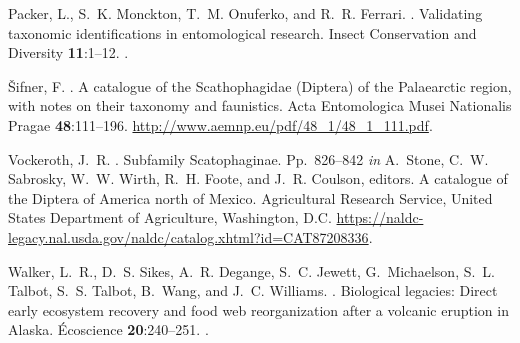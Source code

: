\begin{thebibliography}{8}
Packer, L., S.~K. Monckton, T.~M. Onuferko, and R.~R. Ferrari.
.
\newblock Validating taxonomic identifications in entomological research.
\newblock Insect Conservation and Diversity {\bfseries 11}:1--12.
\newblock {}.

\v{S}ifner, F.
.
\newblock A catalogue of the Scathophagidae (Diptera) of the Palaearctic
  region, with notes on their taxonomy and faunistics.
\newblock Acta Entomologica Musei Nationalis Pragae {\bfseries 48}:111--196.
\newblock \urlprefix\url{http://www.aemnp.eu/pdf/48_1/48_1_111.pdf}.

Vockeroth, J.~R.
.
\newblock Subfamily {Scatophaginae}.
\newblock Pp.\ 826--842 {\em in\/} A.~Stone, C.~W. Sabrosky, W.~W. Wirth, R.~H.
  Foote, and J.~R. Coulson, editors. A catalogue of the {Diptera} of {America}
  north of {Mexico}. Agricultural Research Service, United States Department of
  Agriculture, Washington, D.C.
\newblock
  \urlprefix\url{https://naldc-legacy.nal.usda.gov/naldc/catalog.xhtml?id=CAT87208336}.

Walker, L.~R., D.~S. Sikes, A.~R. Degange, S.~C. Jewett, G.~Michaelson, S.~L.
  Talbot, S.~S. Talbot, B.~Wang, and J.~C. Williams.
.
\newblock Biological legacies: Direct early ecosystem recovery and food web
  reorganization after a volcanic eruption in Alaska.
\newblock Écoscience {\bfseries 20}:240--251.
\newblock {}.

\end{thebibliography}

